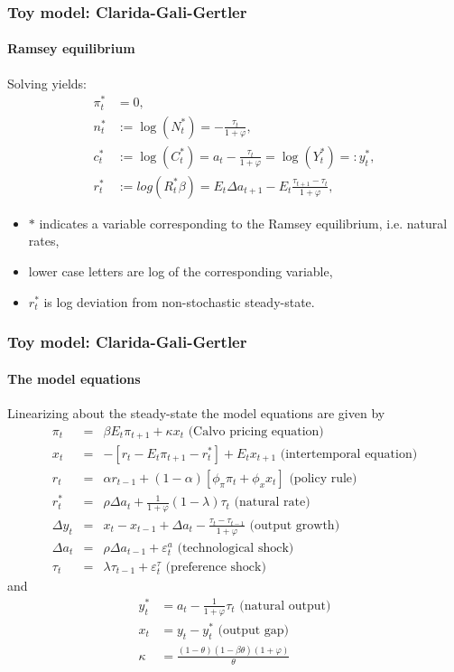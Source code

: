 \documentclass[handout]{beamer}  %
\begin{document}
\begin{frame}\frametitle{Toy model: Clarida-Gali-Gertler}\framesubtitle{Ramsey equilibrium}
Solving yields:
\begin{align*}
\pi_t^* &= 0,\\
n^*_t &:= \log \left( N_{t}^{\ast }\right) =-\frac{\tau _{t}}{1+\varphi },\\
c^*_t &:= \log \left( C_{t}^{\ast }\right) =a_{t}-\frac{\tau _{t}}{1+\varphi } = \log\left( Y_{t}^{\ast }\right) =: y^*_t,\\
r_t^* &:= log(R_t^* \beta) =E_{t}\Delta a_{t+1}-E_{t}\frac{\tau _{t+1}-\tau _{t}}{1+\varphi },
\end{align*}
\begin{itemize}
  \item $\ast $ indicates a variable corresponding to the Ramsey equilibrium, i.e. natural rates,
  \item lower case letters are log of the corresponding variable,
  \item $r_t^*$ is log deviation from non-stochastic steady-state.
\end{itemize}
\end{frame}


\begin{frame}\frametitle{Toy model: Clarida-Gali-Gertler}\framesubtitle{The model equations}
Linearizing about the steady-state the model equations are given by\footnotesize
\begin{eqnarray*}
\pi _{t} &=&\beta E_{t}\pi _{t+1}+\kappa x_{t}\text{ (Calvo pricing equation)} \\
x_{t} &=&-\left[ r_{t}-E_{t}\pi _{t+1}-r_{t}^{\ast }\right] +E_{t}x_{t+1}\text{ (intertemporal equation)} \\
r_{t} &=&\alpha r_{t-1}+(1-\alpha )\left[ \phi _{\pi }\pi _{t}+\phi _{x}x_{t}%
\right] \text{ (policy rule)} \\
r_{t}^{\ast } &=&\rho \Delta a_{t}+\frac{1}{1+\varphi }\left( 1-\lambda
\right) \tau _{t}\text{ (natural rate)} \\
\Delta y_t &=& x_{t} - x_{t-1} + \Delta a_t - \frac{\tau_t - \tau_{t-1}}{1+\varphi} \text{  (output growth)}\\
\Delta a_t &=& \rho \Delta a_{t-1} + \varepsilon_{t}^a \text{  (technological shock)}\\
\tau_t &=& \lambda \tau_{t-1} + \varepsilon_{t}^\tau \text{  (preference shock)}
\end{eqnarray*}
and
\begin{align*} 
y_{t}^{\ast } &=a_{t}-\frac{1}{1+\varphi }\tau _{t}\text{ (natural output)}\\
x_{t} &=y_{t}-y_{t}^{\ast }\text{ (output gap)}\\
\kappa &= \frac{(1-\theta)(1-\beta \theta) (1+\varphi)}{\theta}
\end{align*}
\end{frame}
\end{document}
